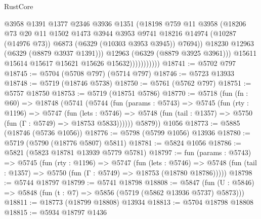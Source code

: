 \begin{lexlean}{RustCore}
\begin{coremodule}
                              @3958
                              @1391
                              @1377
                              @2346
                              @3936
                              @1351
                              (@18198
                                @759
                                @11
                                @3958
                                (@18206
                                  @73
                                  @20
                                  @11
                                  @1502
                                  @1473
                                  @3944
                                  @3953
                                  @9741
                                  @18216
                                  @14974
                                  (@10287 (@14976 @73))
                                  @6873
                                  (@6329 (@10303 @3953 @3945))
                                  @7694))
                              @18230
                              @12963
                              (@6329 (@8879 @3937 @1391)))
                            @12963
                            (@6329 (@8879 @3925 @3961)))
                          @15611
                          @15614
                          @15617
                          @15621
                          @15626
                          @15632)))))))))))
@18741 := @5702 @797
@18745 := @5704 (@5708 @797) (@5714 @797)
@18746 := @5723 @13933
@18748 := @5719 (@18746 @5738)
@18750 := @5761 (@5762 @797)
@18751 := @5757 @18750
@18753 := @5719 (@18751 @5786)
@18770 := @5718
    (fun (fn : @60) =>
    @18748
      (@5741
        (@5744
          (fun (params : @5743) =>
          @5745
            (fun (rty : @1196) =>
            @5747
              (fun (lets : @5746) =>
              @5748 (fun (tail : @1357) => @5750 (fun (Γ : @5749) => @18753 @5833))))))
        @5879))
    @1056
@18773 := @5885 (@18746 (@5736 @1056))
@18776 := @5798 (@5799 @1056) @13936
@18780 := @5719 (@5790 (@18776 @5807) @5811)
@18781 := @5824 @1056
@18786 := @5821 (@5823 @18781 @13939 @5779 @5781)
@18797 := fun (params : @5743) =>
  @5745
    (fun (rty : @1196) =>
    @5747
      (fun (lets : @5746) =>
      @5748 (fun (tail : @1357) => @5750 (fun (Γ : @5749) => @18753 (@18780 @18786)))))
@18798 := @5744 @18797
@18799 := @5741 @18798
@18808 := @5847
    (fun (U : @5846) => @5848 (fun (t : @7) => @5856 (@5719 (@5862 @13936 @5737) @5873)))
@18811 := @18773 (@18799 @18808) @13934
@18813 := @5704 @18798 @18808
@18815 := @5934 @18797 @1436

\end{coremodule}
\end{lexlean}
